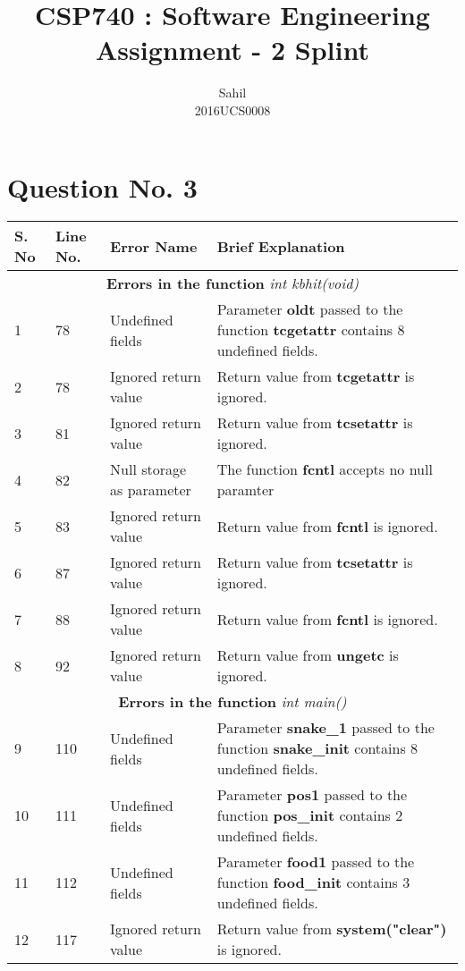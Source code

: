 \documentclass[]{article}
\title{\centering CSP740 : Software Engineering \\Assignment - 2 Splint}
\author{Sahil\\  2016UCS0008}
\begin{document}
	
	\maketitle	
	\section{Question No. 3}
	\large
	\begin{longtable}{ |p{0.5cm}|p{0.75cm}|p{3cm}|p{7cm}|  }
		\hline
		S. No & Line No.	&	Error Name	&	Brief Explanation	\\
		\hline
		\multicolumn{4}{|c|}{\textbf{Errors in the function} \textit{int kbhit(void)}} \\
		\hline
		1 & 78 & Undefined fields & Parameter \textbf{oldt} passed to the function \textbf{tcgetattr} contains 8 undefined fields. \\
		\hline
		2 & 78 & Ignored return value & Return value from \textbf{tcgetattr} is ignored. \\
		\hline
		3 & 81 & Ignored return value & Return value from \textbf{tcsetattr} is ignored. \\
		\hline
		4 & 82 & Null storage as parameter & The function \textbf{fcntl} accepts no null paramter \\
		\hline
		5 & 83 & Ignored return value & Return value from \textbf{fcntl} is ignored. \\
		\hline
		6 & 87 & Ignored return value & Return value from \textbf{tcsetattr} is ignored. \\
		\hline
		7 & 88 & Ignored return value & Return value from \textbf{fcntl} is ignored. \\
		\hline 
		8 & 92 & Ignored return value & Return value from \textbf{ungetc} is ignored. \\
		\hline 
		\multicolumn{4}{|c|}{\textbf{Errors in the function} \textit{int main()}} \\
		\hline 
		9 & 110 & Undefined fields & Parameter \textbf{snake\_1} passed to the function \textbf{snake\_init} contains 8 undefined fields. \\
		\hline 
		10 & 111 & Undefined fields & Parameter \textbf{pos1} passed to the function \textbf{pos\_init} contains 2 undefined fields. \\
		\hline 
		11 & 112 & Undefined fields & Parameter \textbf{food1} passed to the function \textbf{food\_init} contains 3 undefined fields. \\
		\hline 
		12 & 117 & Ignored return value  & Return value from \textbf{system("clear")} is ignored. \\

\end{longtable}
\end{document}
